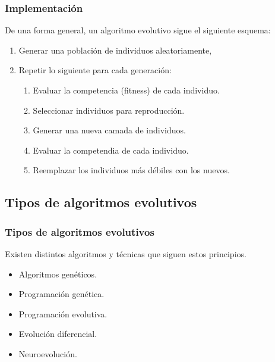 \documentclass[10pt]{beamer}
\begin{document}
\begin{frame}
  \frametitle{Implementación}

  De una forma general, un algoritmo evolutivo sigue el siguiente esquema:
  \begin{enumerate}
    \item Generar una población de individuos aleatoriamente,
    \item Repetir lo siguiente para cada generación:
    \begin{enumerate}
      \item Evaluar la competencia (fitness) de cada individuo.
      \item Seleccionar individuos para reproducción.
      \item Generar una nueva camada de individuos.
      \item Evaluar la competendia de cada individuo.
      \item Reemplazar los individuos más débiles con los nuevos.
    \end{enumerate}
  \end{enumerate}
  
\end{frame}

\subsection{Tipos de algoritmos evolutivos}

\begin{frame}
  \frametitle{Tipos de algoritmos evolutivos}

  Existen distintos algoritmos y técnicas que siguen estos principios. 
  \begin{itemize}
    \item Algoritmos genéticos.
    \item Programación genética.
    \item Programación evolutiva.
    \item Evolución diferencial.
    \item Neuroevolución.
  \end{itemize}
\end{frame}
\end{document}
